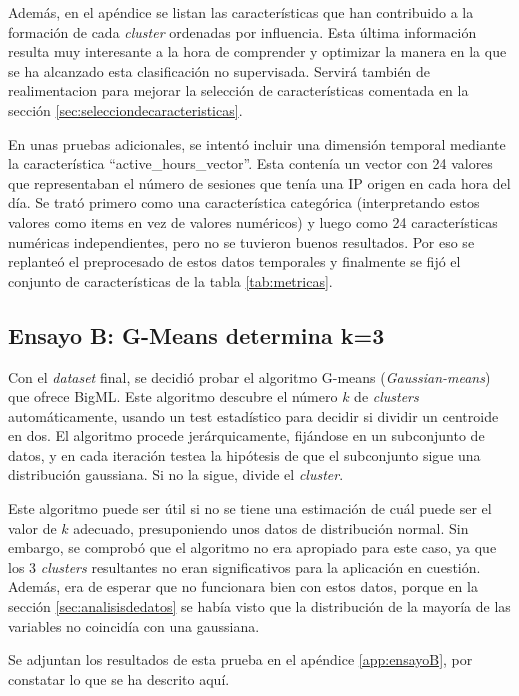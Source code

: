 Además, en el apéndice se listan las características que han contribuido a la formación de cada \emph{cluster} ordenadas por influencia.
Esta última información resulta muy interesante a la hora de comprender y optimizar la manera en la que se ha alcanzado esta clasificación no supervisada.
Servirá también de realimentacion para mejorar la selección de características comentada en la sección \ref{sec:selecciondecaracteristicas}.

En unas pruebas adicionales, se intentó incluir una dimensión temporal mediante la característica ``active\_hours\_vector''.
Esta contenía un vector con 24 valores que representaban el número de sesiones que tenía una IP origen en cada hora del día.
Se trató primero como una característica categórica (interpretando estos valores como items en vez de valores numéricos) y luego como 24 características numéricas independientes,
pero no se tuvieron buenos resultados.
Por eso se replanteó el preprocesado de estos datos temporales y finalmente se fijó el conjunto de características de la tabla \ref{tab:metricas}.

\subsection{Ensayo B: G-Means determina k=3}\label{subsec:ensayoB}

Con el \emph{dataset} final, se decidió probar el algoritmo G-means (\emph{Gaussian-means}) que ofrece BigML.
Este algoritmo descubre el número $k$ de \emph{clusters} automáticamente, usando un test estadístico para decidir si dividir un centroide en dos.
El algoritmo procede jerárquicamente, fijándose en un subconjunto de datos, y en cada iteración testea la hipótesis de que el subconjunto sigue una distribución gaussiana.
Si no la sigue, divide el \emph{cluster}.

Este algoritmo puede ser útil si no se tiene una estimación de cuál puede ser el valor de $k$ adecuado, presuponiendo unos datos de distribución normal.
Sin embargo, se comprobó que el algoritmo no era apropiado para este caso, ya que los 3 \emph{clusters} resultantes no eran significativos para la aplicación en cuestión.
Además, era de esperar que no funcionara bien con estos datos, porque en la sección \ref{sec:analisisdedatos} se había visto que la distribución de la mayoría de las variables no coincidía con una gaussiana.

Se adjuntan los resultados de esta prueba en el apéndice \ref{app:ensayoB}, por constatar lo que se ha descrito aquí.

